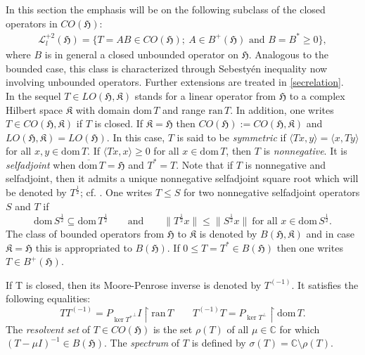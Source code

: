 \documentclass{amsart}
\newcommand{\la}{\langle}
\newcommand{\ra}{\rangle}
\newcommand{\h}{\mathfrak{H}}
\newcommand{\kk}{\mathfrak{K}}
\newcommand{\lohk}{LO(\h,\kk)}
\newcommand{\loh}{LO(\h)}
\newcommand{\cohk}{CO(\h,\kk)}
\newcommand{\coh}{CO(\h)}
\newcommand{\ran}{\mathrm{ran}\,}
\newcommand{\ranT}{\mathrm{ran}  \, T }
\newcommand{\bhk}{B(\h,\kk)}
\newcommand{\bh}{B(\h)}
\newcommand{\D}{\mathrm{dom}\,}
\newcommand{\DT}{\mathrm{dom}\,T }
\newcommand{\adj}{^*}
\newcommand{\inv}{^{-1}}
\newcommand{\tstar}{T^{*}}
\newcommand{\half}{^{\frac{1}{2}}}
\newcommand{\orth}{^\perp}
\newcommand{\C}{\mathbb{C}}
\newcommand{\inclu}{\subseteq}
\newcommand{\lplus}{B^{+}(\h)}
\newcommand{\ldeux}{\mathcal{L}_l^{+2}(\h)}
\newcommand{\bardt}{\overline{\D}T}
\newcommand{\rest}{\upharpoonright}
\numberwithin{equation}{section}
\begin{document}
In this section the emphasis will be on  the following  subclass of the closed operators in $\coh :$
   \begin{eqnarray}
     \ldeux=
            \Big\{T=AB \in \coh; \ A \in \lplus \text{ and } B = B\adj \geq 0   \Big\} \label{definitionldeux2},
            \end{eqnarray}
  where $B$ is in general a closed unbounded operator on  $\h.$
   Analogous  to the bounded case, this class is characterized through Sebestyén inequality now involving  unbounded operators. Further extensions are treated in \cref{secrelation}.\\
\hspace*{0.4cm} In the sequel  $T\in \lohk$ stands for    a linear operator from $\h$ to a complex Hilbert space $\kk$ with   domain $\DT$ and range $\ranT$. In addition, one writes $T \in \cohk$ if $T$ is closed.  If $\kk=\h$ then $\coh:=\cohk$ and $\lohk=\loh.$ In this case, $T$ is said to be  \emph{symmetric} if $\la Tx , y\ra = \la x, Ty \ra $ for all $x,y \in \DT.$ If $\la Tx, x \ra \geq 0$ for all $x \in \DT$, then $T$ is \emph{nonnegative}. It is  \emph{selfadjoint} when $\bardt=\h  $ and $\tstar= T$.   Note that  if $T$ is nonnegative and selfadjoint, then it admits a unique  nonnegative selfadjoint square root which will be denoted by $ T\half $; cf. \cite{Sebestyen2017,wouk1966note}.  One writes $T \leq S$ for two  nonnegative selfadjoint operators $S$ and $T$ if
     $$
    \D S\half \inclu \D T\half \qquad \text{and} \qquad
    \| T\half x\| \leq \|S\half x\| \ \text{for all } x \in \D S\half.
    $$
 The class of bounded operators from $\h$ to $\kk$ is denoted by $\bhk$ and  in case $\kk=\h$ this is appropriated to   $\bh.$ If $0 \leq T= \tstar   \in \bh$ then one writes $ T \in \lplus.$


    If T is closed, then its Moore-Penrose inverse   is denoted by  $T^{(-1)}$. It satisfies the following equalities:
    $$
    T T^{(-1)} = P_{\ker {\tstar}\orth} I \rest \ran T \qquad  T^{(-1)} T= P_{\ker T\orth} \rest \DT.
    $$
     The \emph{resolvent set} of $T \in CO(\h)$ is the set $\rho(T)$ of all $\mu \in   \C $ for which $ (T - \mu I)\inv \in B(\h)$.
     The \emph{spectrum} of $T$ is  defined by $\sigma(T)=\C \setminus \rho(T).$
\end{document}
